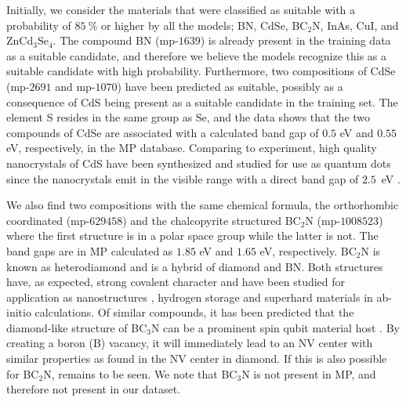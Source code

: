 \documentclass[superscriptaddress,unsortedaddress,
 amsmath,amssymb,
 aps,
]{revtex4-2}
\begin{document}
Initially, we consider the materials that were classified as suitable with a probability of $85 \ \%$ or higher by all the models; BN, CdSe, BC$_2$N, InAs, CuI, and ZnCd$_3$Se$_4$. 
The compound BN (mp-$1639$) is already present in the training data as a suitable candidate, and therefore we believe the models recognize this as a suitable candidate with high probability. Furthermore, two compositions of CdSe (mp-$2691$ and mp-$1070$) have been predicted as suitable, possibly as a consequence of CdS being present as a suitable candidate in the training set. The element S resides in the same group as Se, and the data shows that the two compounds of CdSe are associated with a calculated band gap of $0.5$ eV and $0.55$ eV, respectively, in the MP database. 
Comparing to experiment, high quality nanocrystals of CdS have been synthesized and studied for use as quantum dots since the nanocrystals emit in the visible range with a direct band gap of $2.5$~eV \cite{CelebiSerdar2007SaCo, BanerjeeR2000Eots}. %

We also find two compositions with the same chemical formula, the orthorhombic coordinated (mp-$629458$) and the chalcopyrite structured BC$_2$N (mp-$1008523$) where the first structure is in a polar space group while the latter is not. The band gaps are in MP calculated as $1.85$ eV and $1.65$ eV, respectively. BC$_2$N is known as heterodiamond and is a hybrid of diamond and BN. Both structures have, as expected, strong covalent character and have been studied for application as nanostructures \cite{Gao2017}, hydrogen storage \cite{Cai2017} and superhard materials \cite{Li2017, Jiang2020} in ab-initio calculations. Of similar compounds, it has been predicted that the diamond-like structure of BC$_3$N can be a prominent spin qubit material host \cite{Wang2020SpinQB}. By creating a boron (B) vacancy, it will immediately lead to an NV center with similar properties as found in the NV center in diamond. If this is also possible for BC$_2$N, remains to be seen. We note that BC$_3$N is not present in MP, and therefore not present in our dataset.
\end{document}
